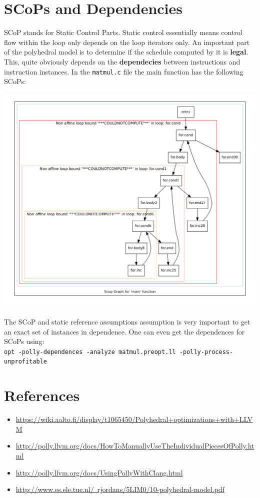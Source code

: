 \documentclass[a4paper,12pt]{report}
\begin{document}
\section{SCoPs and Dependencies}
SCoP stands for Static Control Parts. Static control essentially means control flow within the loop only depends on the loop iterators only. An important part of the polyhedral model is to determine if the schedule computed by it is \textbf{legal}. This, quite obviously depends on the \textbf{dependecies} between instructions and instruction instances. In the \texttt{matmul.c} file the main function has the following SCoPs:
\begin{center}
\includegraphics[scale=0.40]{scop.png}
\end{center}
The SCoP and static reference assumptions assumption is very important to get an exact set of instances in dependence. One can even get the dependences for SCoPs using:\\
\texttt{opt -polly-dependences -analyze matmul.preopt.ll -polly-process-unprofitable}
\newpage
\section{References}
\begin{itemize}
\item \href{https://wiki.aalto.fi/display/t1065450/Polyhedral+optimizations+with+LLVM}{https://wiki.aalto.fi/display/t1065450/Polyhedral+optimizations+with+LLVM}
\item \href{http://polly.llvm.org/docs/HowToManuallyUseTheIndividualPiecesOfPolly.html}{http://polly.llvm.org/docs/HowToManuallyUseTheIndividualPiecesOfPolly.html}
\item \href{http://polly.llvm.org/docs/UsingPollyWithClang.html}{http://polly.llvm.org/docs/UsingPollyWithClang.html}
\item \href{http://www.es.ele.tue.nl/~rjordans/5LIM0/10-polyhedral-model.pdf}{http://www.es.ele.tue.nl/~rjordans/5LIM0/10-polyhedral-model.pdf}
\end{itemize}
\end{document}
